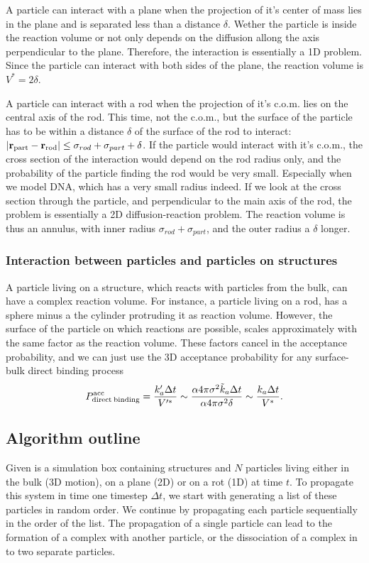 A particle can interact with a plane when the projection of it's center of mass lies in the plane and is separated less than a distance $\delta$. Wether the particle is inside the reaction volume or not only depends on the diffusion allong the axis perpendicular to the plane. Therefore, the interaction is essentially a 1D problem. Since the particle can interact with both sides of the plane, the reaction volume is $V^*=2 \delta$.

A particle can interact with a rod when the projection of it's c.o.m. lies on the central axis of the rod. This time, not the c.o.m., but the surface of the particle has to be within a distance $\delta$ of the surface of the rod to interact: $|{\bf r}_{\rm part}-{\bf r}_{\rm rod}| \leq \sigma_{rod}+\sigma_{part} + \delta$. If the particle would interact with it's c.o.m., the cross section of the interaction would depend on the rod radius only, and the probability of the particle finding the rod would be very small. Especially when we model DNA, which has a very small radius indeed. If we look at the cross section through the particle, and perpendicular to the main axis of the rod, the problem is essentially a 2D diffusion-reaction problem. The reaction volume is thus an annulus, with inner radius $\sigma_{rod} + \sigma_{part}$, and the outer radius a $\delta$ longer.

\subsubsection{Interaction between particles and particles on structures}
A particle living on a structure, which reacts with particles from the bulk, can have a complex reaction volume. For instance, a particle living on a rod, has a sphere minus a the cylinder protruding it as reaction volume. However, the surface of the particle on which reactions are possible, scales approximately with the same factor as the reaction volume. These factors cancel in the acceptance probability, and we can just use the 3D acceptance probability for any surface-bulk direct binding process
\begin{equation}
 P^{\rm acc}_{\rm direct\:binding} = \frac{k'_a \Delta t}{V'^*} \sim \frac{ \alpha 4 \pi \sigma^2 \tilde{k}_a \Delta t}{\alpha 4 \pi \sigma^2 \delta} \sim \frac{k_a \Delta t}{V^*}.
\end{equation}


\subsection{Algorithm outline}
Given is a simulation box containing structures and $N$ particles living either in the bulk (3D motion), on a plane (2D) or on a rot (1D) at time $t$. To propagate this system in time one timestep $\Delta t$, we start with generating a list of these particles in random order. We continue by propagating each particle sequentially in the order of the list. The propagation of a single particle can lead to the formation of a complex with another particle, or the dissociation of a complex in to two separate particles. 

